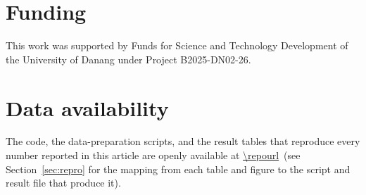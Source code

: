 \documentclass[final,5p,times]{elsarticle}
\newcommand{\repolink}{\expandafter\url\expandafter{\repourl}}
\begin{document}
\section*{Funding}
This work was supported by Funds for Science and Technology Development of the University of
Danang under Project B2025-DN02-26.

\section*{Data availability}
The code, the data-preparation scripts, and the result tables that reproduce every number
reported in this article are openly available at
\repolink\ (see Section~\ref{sec:repro} for the mapping from each
table and figure to the script and result file that produce it).



\end{document}
